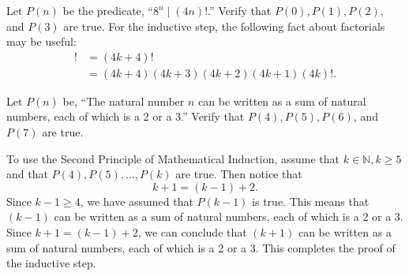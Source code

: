\begin{list}{\bf{\ref{exer:sec52-3}.}}
\item Let  $P( n )$  be the predicate, ``$8^n \mid ( 4n )!$.''  Verify that  
$P( 0 ), P( 1 ), P( 2 )$, and $P( 3 )$ are true. 
For the inductive step, the following fact about factorials may be useful:
\begin{align*}
[ 4 (k + 1 ) ]! &= ( 4k + 4 )! \\
                           &= (4k + 4)(4k + 3)(4k + 2)(4k + 1) ( 4k )!.
\end{align*}
\end{list}

\begin{list}{\bf{\ref{exer:sec52-4}.}}
\item Let  $P( n )$  be, ``The natural number  $n$  can be written as a sum of natural numbers, each of which is a 2  or a  3.''  Verify that  
$P( 4 ), P( 5 ), P( 6 )$, and $P( 7 )$ are true.

To use the Second Principle of Mathematical Induction, assume that  $k \in \mathbb{N}, k \geq 5$ and that  
$P( 4 ), P( 5 ),  \ldots , P( k )$ are true.  Then notice that
\[
k + 1 = ( {k - 1} ) + 2.
\]
Since  $k - 1 \geq 4$, we have assumed that  $P( {k - 1} )$ is true.  This means that $(k-1)$ can be written as a sum of natural numbers, each of which is a 2 or a 3.  Since $k + 1 = (k - 1) + 2$, we can conclude that $(k+1)$ can be written as a sum of natural numbers, each of which is a 2 or a 3.  This completes the proof of the inductive step.
\end{list}



